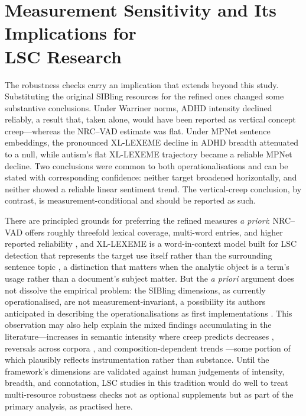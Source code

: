 \section[Measurement Sensitivity and Its Implications for LSC Research]{Measurement Sensitivity and Its Implications for\texorpdfstring{\\}{ }LSC Research}
\label{sec:discussion-measurement-sensitivity}

The robustness checks carry an implication that extends beyond this study. Substituting the original SIBling resources for the refined ones changed some substantive conclusions. Under Warriner norms, ADHD intensity declined reliably, a result that, taken alone, would have been reported as vertical concept creep---whereas the NRC--VAD estimate was flat. Under MPNet sentence embeddings, the pronounced XL-LEXEME decline in ADHD breadth attenuated to a null, while autism's flat XL-LEXEME trajectory became a reliable MPNet decline. Two conclusions were common to both operationalisations and can be stated with corresponding confidence: neither target broadened horizontally, and neither showed a reliable linear sentiment trend. The vertical-creep conclusion, by contrast, is measurement-conditional and should be reported as such.

There are principled grounds for preferring the refined measures \textit{a priori}: NRC--VAD offers roughly threefold lexical coverage, multi-word entries, and higher reported reliability \citep{mohammadNRCVADLexicon2025}, and XL-LEXEME is a word-in-context model built for LSC detection that represents the target use itself rather than the surrounding sentence topic \citep{cassottiXLLEXEMEWiCPretrained2023}, a distinction that matters when the analytic object is a term's usage rather than a document's subject matter. But the \textit{a priori} argument does not dissolve the empirical problem: the SIBling dimensions, as currently operationalised, are not measurement-invariant, a possibility its authors anticipated in describing the operationalisations as first implementations \citep{baesMultidimensionalFrameworkEvaluating2024}. This observation may also help explain the mixed findings accumulating in the literature---increases in semantic intensity where creep predicts decreases \citep{xiaoHaveConceptsAnxiety2023}, reversals across corpora \citep{iacobComputationalAnalysisEmergence2026}, and composition-dependent trends \citep{pislRevisitingSemanticSeverity2025}---some portion of which plausibly reflects instrumentation rather than substance. Until the framework's dimensions are validated against human judgements of intensity, breadth, and connotation, LSC studies in this tradition would do well to treat multi-resource robustness checks not as optional supplements but as part of the primary analysis, as practised here.

